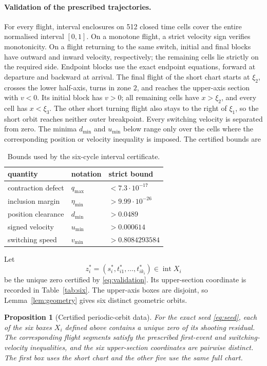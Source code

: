 \documentclass[11pt]{article}
\newtheorem{proposition}[theorem]{Proposition}
\theoremstyle{remark}
\newcommand{\interior}{\operatorname{int}}
\begin{document}
\paragraph{Validation of the prescribed trajectories.}
For every flight, interval enclosures on 512 closed time cells cover the
entire normalised interval \([0,1]\).
On a monotone flight, a strict velocity sign
verifies monotonicity.  On a flight returning to the same switch, initial
and final blocks have outward and inward velocity, respectively; the
remaining cells lie strictly on the required side.  Endpoint blocks use
the exact endpoint equations, forward at departure and backward at arrival.
The final flight of the short chart starts at \(\xi_2\), crosses the
lower half-axis, turns in zone \(2\), and
reaches the upper-axis section with \(v<0\).  Its initial block has
\(v>0\); all remaining cells have \(x>\xi_2\), and every cell has
\(x<\xi_3\).  The other short turning flight also stays to the right
of \(\xi_1\), so the short orbit reaches neither outer breakpoint.
Every switching velocity is separated from zero.  The minima
\(d_{\min}\) and \(u_{\min}\) below range only over the cells where the corresponding
position or velocity inequality is imposed.  The certified bounds are
\begin{table}[H]
\centering
\begin{tabular}{lll}
\toprule
quantity&notation&strict bound\\\midrule
contraction defect&$q_{\max}$&$<7.3\cdot10^{-17}$\\
inclusion margin&$\eta_{\min}$&$>9.99\cdot10^{-26}$\\
position clearance&$d_{\min}$&$>0.0489$\\
signed velocity&$u_{\min}$&$>0.000614$\\
switching speed&$v_{\min}$&$>0.8084293584$\\
\bottomrule
\end{tabular}
\caption{Bounds used by the six-cycle interval certificate.}
\label{tab:bounds}
\end{table}

Let
\[
 z_i^*=(s_i^*,t_{i1}^*,\ldots,t_{ik_i}^*)\in\interior X_i
\]
be the unique zero certified by \eqref{eq:validation}.  Its upper-section
coordinate is recorded in Table~\ref{tab:six}.  The upper-axis boxes are
disjoint, so Lemma~\ref{lem:geometry} gives six distinct geometric orbits.

\begin{proposition}[Certified periodic-orbit data]\label{prop:certified-data}
For the exact seed \eqref{eq:seed}, each of the six boxes \(X_i\)
defined above contains a unique zero of its shooting residual.  The
corresponding flight segments satisfy the prescribed first-event and
switching-velocity inequalities, and the six upper-section coordinates are
pairwise distinct.  The first box uses the short chart and the other five use the
same full chart.
\end{proposition}
\end{document}
